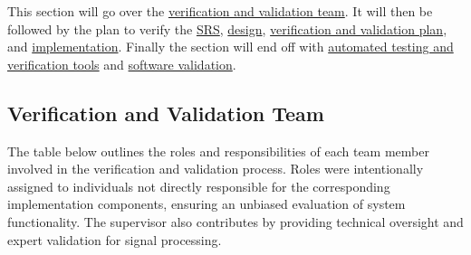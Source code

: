 \documentclass[12pt, titlepage]{article}
\begin{document}
This section will go over the \hyperref[sec:vnv_team]{verification and
validation team}. It will then be followed by the plan to verify the
\hyperref[sec:srs_verification]{SRS},
\hyperref[sec:design_verification]{design},
\hyperref[sec:vnv_plan_verification]{verification and validation plan}, and
\hyperref[sec:implementation_verification]{implementation}. Finally the section
will end off with \hyperref[sec:testing_tools]{automated testing and
verification tools} and \hyperref[sec:software_validation]{software validation}.

\subsection{Verification and Validation Team}\label{sec:vnv_team}

The table below outlines the roles and responsibilities of each team member
involved in the verification and validation process. Roles were intentionally
assigned to individuals not directly responsible for the corresponding
implementation components, ensuring an unbiased evaluation of system
functionality. The supervisor also contributes by providing technical oversight
and expert validation for signal processing.
\end{document}
